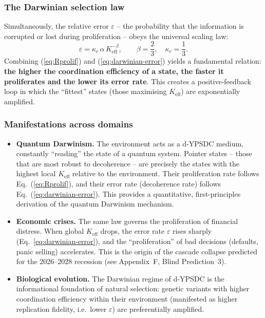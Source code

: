 \documentclass[12pt,a4paper]{article}
\theoremstyle{remark}
\begin{document}
	\subsubsection*{The Darwinian selection law}
	Simultaneously, the relative error \(\varepsilon\) -- the probability that
	the information is corrupted or lost during proliferation -- obeys the
	universal scaling law:
	\begin{equation}
		\varepsilon = \kappa_c \, \alpha \, K_{\mathrm{eff}}^{-\beta},
		\qquad \beta = \frac{2}{3},\quad \kappa_c = \frac{1}{3}.
		\label{eq:darwinian-error}
	\end{equation}
	Combining (\ref{eq:Rprolif}) and (\ref{eq:darwinian-error}) yields a
	fundamental relation: \textbf{the higher the coordination efficiency of a
		state, the faster it proliferates and the lower its error rate}. This
	creates a positive-feedback loop in which the ``fittest'' states (those
	maximising \(K_{\mathrm{eff}}\)) are exponentially amplified.
	
	\subsubsection*{Manifestations across domains}
	\begin{itemize}[leftmargin=*]
		\item \textbf{Quantum Darwinism.} The environment acts as a d-YPSDC
		medium, constantly ``reading'' the state of a quantum system. Pointer
		states -- those that are most robust to decoherence -- are precisely
		the states with the highest local \(K_{\mathrm{eff}}\) relative to the
		environment. Their proliferation rate follows Eq.~(\ref{eq:Rprolif}),
		and their error rate (decoherence rate) follows
		Eq.~(\ref{eq:darwinian-error}). This provides a quantitative,
		first-principles derivation of the quantum Darwinism mechanism.
		\item \textbf{Economic crises.} The same law governs the proliferation
		of financial distress. When global \(K_{\mathrm{eff}}\) drops, the
		error rate \(\varepsilon\) rises sharply (Eq.~\ref{eq:darwinian-error}),
		and the ``proliferation'' of bad decisions (defaults, panic selling)
		accelerates. This is the origin of the cascade collapse predicted
		for the 2026--2028 recession (see Appendix~F, Blind Prediction~3).
		\item \textbf{Biological evolution.} The Darwinian regime of d-YPSDC
		is the informational foundation of natural selection: genetic
		variants with higher coordination efficiency within their environment
		(manifested as higher replication fidelity, i.e.\ lower \(\varepsilon\))
		are preferentially amplified.
	\end{itemize}
	
\end{document}
